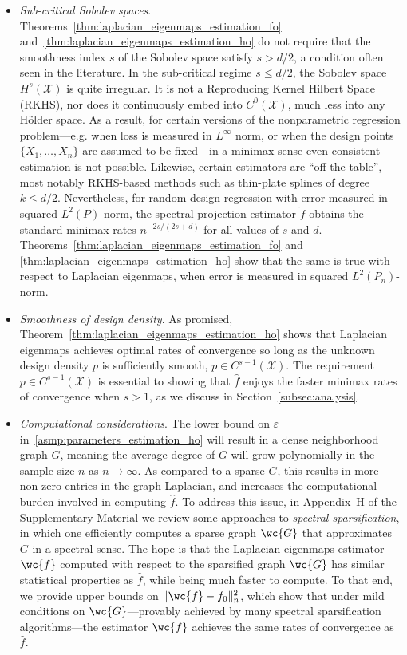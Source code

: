 \documentclass[aos]{imsart}
\theoremstyle{plain}
\theoremstyle{definition}
\theoremstyle{remark}
\newcommand{\wt}[1]{\widetilde{#1}}
\newcommand{\wh}[1]{\widehat{#1}}
\newcommand{\mc}[1]{\mathcal{#1}}
\newcommand{\1}{\mathbf{1}}
\begin{document}
\begin{itemize}
	\item \emph{Sub-critical Sobolev spaces}. Theorems~\ref{thm:laplacian_eigenmaps_estimation_fo} and~\ref{thm:laplacian_eigenmaps_estimation_ho} do not require that the smoothness index $s$ of the Sobolev space satisfy $s > d/2$, a condition often seen in the literature. In the sub-critical regime $s \leq d/2$, the Sobolev space $H^s(\mc{X})$ is quite irregular. It is not a Reproducing Kernel Hilbert Space (RKHS), nor does it continuously embed into $C^0(\mc{X})$, much less into any H\"{o}lder space. As a result, for certain versions of the nonparametric regression problem---e.g. when loss is measured in $L^{\infty}$ norm, or when the design points $\{X_1,\ldots,X_n\}$ are assumed to be fixed---in a minimax sense even consistent estimation is not possible. Likewise, certain estimators are ``off the table'', most notably RKHS-based methods such as thin-plate splines of degree $k \leq d/2$. Nevertheless, for random design regression with error measured in squared $L^2(P)$-norm, the spectral projection estimator $\wt{f}$ obtains the standard minimax rates $n^{-2s/(2s + d)}$ for all values of $s$ and $d$. Theorems~\ref{thm:laplacian_eigenmaps_estimation_fo} and \ref{thm:laplacian_eigenmaps_estimation_ho} show that the same is true with respect to Laplacian eigenmaps, when error is measured in squared $L^2(P_n)$-norm.
	\item \emph{Smoothness of design density}. As promised,  Theorem~\ref{thm:laplacian_eigenmaps_estimation_ho} shows that Laplacian eigenmaps achieves optimal rates of convergence so long as the unknown design density $p$ is sufficiently smooth, $p \in C^{s - 1}(\mc{X})$. The requirement $p \in C^{s - 1}(\mc{X})$ is essential to showing that $\wh{f}$ enjoys the faster minimax rates of convergence when $s > 1$,  as we discuss in Section~\ref{subsec:analysis}. 
	\item \emph{Computational considerations}. The lower bound on $\varepsilon$ in~\ref{asmp:parameters_estimation_ho} will result in a dense neighborhood graph $G$, meaning the average degree of $G$ will grow polynomially in the sample size $n$ as $n \to \infty$. As compared to a sparse $G$, this results in more non-zero entries in the graph Laplacian, and increases the computational burden involved in computing $\wh{f}$. To address this issue, in Appendix~H of the Supplementary Material we review some approaches to \emph{spectral sparsification}, in which one efficiently computes a sparse graph $\wc{G}$ that approximates $G$ in a spectral sense. The hope is that the Laplacian eigenmaps estimator $\wc{f}$ computed with respect to the sparsified graph $\wc{G}$ has similar statistical properties as $\wh{f}$, while being much faster to compute. To that end, we provide upper bounds on $\|\wc{f} - f_0\|_n^2$, which show that under mild conditions on $\wc{G}$---provably achieved by many spectral sparsification algorithms---the estimator $\wc{f}$ achieves the same rates of convergence as $\wh{f}$. 
\end{itemize}
\end{document}
